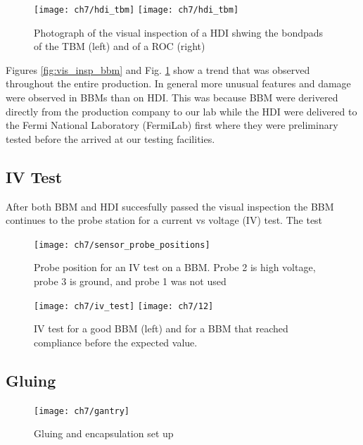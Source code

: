 \begin{figure}[!h]
  \centering
  \texttt{[image: ch7/hdi\_tbm]}
  \texttt{[image: ch7/hdi\_tbm]}
  \caption[Visual inspection of a HDI.]{Photograph of the visual inspection of a HDI shwing the bondpads of the TBM (left) and of a ROC (right)}\label{fig:vis_insp_hdi}
\end{figure}

Figures \ref{fig:vis_insp_bbm} and Fig. \ref{fig:vis_insp_hdi} show a trend that was observed throughout the entire production. In general more unusual features and damage were observed in BBMs than on HDI. This was because BBM were derivered directly from the production company to our lab while the HDI were delivered to the Fermi National Laboratory (FermiLab) first where they were preliminary tested before the arrived at our testing facilities. 

\subsection{IV Test}
After both BBM and HDI succesfully passed the visual inspection the BBM continues to the probe station for a current vs voltage (IV) test. The test 






\begin{figure}[!h]
  \centering
  \texttt{[image: ch7/sensor\_probe\_positions]}
  \caption[Probe position for an IV test]{Probe position for an IV test on a BBM. Probe 2 is high voltage, probe 3 is ground, and probe 1 was not used}\label{fig:sensor_probe_positions}
\end{figure}

\begin{figure}[!h]
  \centering
  \texttt{[image: ch7/iv\_test]}
  \texttt{[image: ch7/12]}
  \caption[IV results of a BBM]{IV test for a good BBM (left) and for a BBM that reached compliance before the expected value.}\label{fig:iv_test}
\end{figure}

\subsection{Gluing}

\begin{figure}[!h]
  \centering
  \texttt{[image: ch7/gantry]}
  \caption[Gluing and encapsulation set up]{Gluing and encapsulation set up}\label{fig:gantry}
\end{figure}

